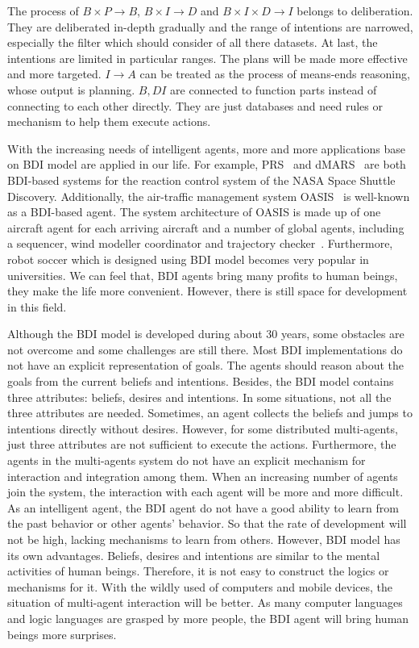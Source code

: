 The process of $B \times P \to B$, $B \times I \to D$ and $B \times I \times D \to I$ belongs to deliberation.
They are deliberated in-depth gradually and the range of intentions are narrowed, especially the filter which should consider of all there datasets.
At last, the intentions are limited in particular ranges.
The plans will be made more effective and more targeted.
$I \to A $ can be treated as the process of means-ends reasoning, whose output is planning.
$B,D I$ are connected to function parts instead of connecting to each other directly.
They are just databases and need rules or mechanism to help them execute actions.

With the increasing needs of intelligent agents, more and more applications base on BDI model are applied in our life.
For example, PRS~\cite{Ingrand_PRS_1992} and dMARS~\cite{Mark_dMARS_2004} are both BDI-based systems for the reaction control system of the NASA Space Shuttle Discovery.
Additionally, the air-traffic management system OASIS~\cite{Magnus_OASIS_1992} is well-known as a BDI-based agent.
The system architecture of OASIS is made up of one aircraft agent for each arriving aircraft and a number of global agents, including a sequencer, wind modeller coordinator and trajectory checker~\cite{Rao_BDITheory_1995}.
Furthermore, robot soccer which is designed using BDI model becomes very popular in universities.
We can feel that, BDI agents bring many profits to human beings, they make the life more convenient.
However, there is still space for development in this field.

Although the BDI model is developed during about 30 years, some obstacles are not overcome and some challenges are still there.
Most BDI implementations do not have an explicit representation of goals.
The agents should reason about the goals from the current beliefs and intentions.
Besides, the BDI model contains three attributes: beliefs, desires and intentions.
In some situations, not all the three attributes are needed.
Sometimes, an agent collects the beliefs and jumps to intentions directly without desires.
However, for some distributed multi-agents, just three attributes are not sufficient to execute the actions.
Furthermore, the agents in the multi-agents system do not have an explicit mechanism for interaction and integration among them.
When an increasing number of agents join the system, the interaction with each agent will be more and more difficult.
As an intelligent agent, the BDI agent do not have a good ability to learn from the past behavior or other agents’ behavior.
So that the rate of development will not be high, lacking mechanisms to learn from others.
However, BDI model has its own advantages.
Beliefs, desires and intentions are similar to the mental activities of human beings.
Therefore, it is not easy to construct the logics or mechanisms for it.
With the wildly used of computers and mobile devices, the situation of multi-agent interaction will be better.
As many computer languages and logic languages are grasped by more people, the BDI agent will bring human beings more surprises.

